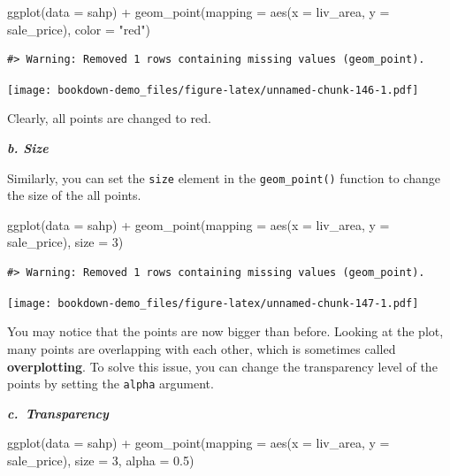 \documentclass[
]{book}
\newenvironment{Shaded}{\begin{snugshade}}{\end{snugshade}}
\newcommand{\AttributeTok}[1]{\textcolor[rgb]{0.77,0.63,0.00}{#1}}
\newcommand{\DecValTok}[1]{\textcolor[rgb]{0.00,0.00,0.81}{#1}}
\newcommand{\FloatTok}[1]{\textcolor[rgb]{0.00,0.00,0.81}{#1}}
\newcommand{\FunctionTok}[1]{\textcolor[rgb]{0.00,0.00,0.00}{#1}}
\newcommand{\NormalTok}[1]{#1}
\newcommand{\SpecialCharTok}[1]{\textcolor[rgb]{0.00,0.00,0.00}{#1}}
\newcommand{\StringTok}[1]{\textcolor[rgb]{0.31,0.60,0.02}{#1}}
\begin{document}
\begin{Shaded}
\begin{Highlighting}[]
\FunctionTok{ggplot}\NormalTok{(}\AttributeTok{data =}\NormalTok{ sahp) }\SpecialCharTok{+} \FunctionTok{geom\_point}\NormalTok{(}\AttributeTok{mapping =} \FunctionTok{aes}\NormalTok{(}\AttributeTok{x =}\NormalTok{ liv\_area, }\AttributeTok{y =}\NormalTok{ sale\_price), }\AttributeTok{color =} \StringTok{"red"}\NormalTok{)}
\end{Highlighting}
\end{Shaded}

\begin{verbatim}
#> Warning: Removed 1 rows containing missing values (geom_point).
\end{verbatim}

\texttt{[image: bookdown-demo\_files/figure-latex/unnamed-chunk-146-1.pdf]}

Clearly, all points are changed to red.

\textbf{\emph{b. Size}}

Similarly, you can set the \texttt{size} element in the \texttt{geom\_point()} function to change the size of the all points.

\begin{Shaded}
\begin{Highlighting}[]
\FunctionTok{ggplot}\NormalTok{(}\AttributeTok{data =}\NormalTok{ sahp) }\SpecialCharTok{+} \FunctionTok{geom\_point}\NormalTok{(}\AttributeTok{mapping =} \FunctionTok{aes}\NormalTok{(}\AttributeTok{x =}\NormalTok{ liv\_area, }\AttributeTok{y =}\NormalTok{ sale\_price), }\AttributeTok{size =} \DecValTok{3}\NormalTok{)}
\end{Highlighting}
\end{Shaded}

\begin{verbatim}
#> Warning: Removed 1 rows containing missing values (geom_point).
\end{verbatim}

\texttt{[image: bookdown-demo\_files/figure-latex/unnamed-chunk-147-1.pdf]}

You may notice that the points are now bigger than before. Looking at the plot, many points are overlapping with each other, which is sometimes called \textbf{overplotting}. To solve this issue, you can change the transparency level of the points by setting the \texttt{alpha} argument.

\textbf{\emph{c.~Transparency}}

\begin{Shaded}
\begin{Highlighting}[]
\FunctionTok{ggplot}\NormalTok{(}\AttributeTok{data =}\NormalTok{ sahp) }\SpecialCharTok{+} \FunctionTok{geom\_point}\NormalTok{(}\AttributeTok{mapping =} \FunctionTok{aes}\NormalTok{(}\AttributeTok{x =}\NormalTok{ liv\_area, }\AttributeTok{y =}\NormalTok{ sale\_price), }\AttributeTok{size =} \DecValTok{3}\NormalTok{, }\AttributeTok{alpha =} \FloatTok{0.5}\NormalTok{)}
\end{Highlighting}
\end{Shaded}
\end{document}

